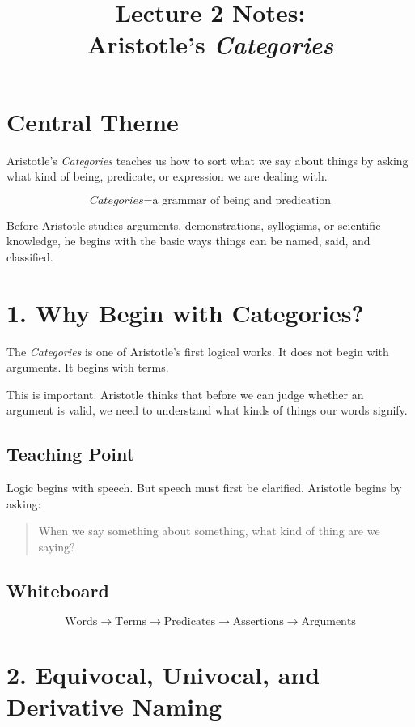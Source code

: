 \documentclass[12pt]{article}
\title{Lecture 2 Notes: \\ Aristotle's \textit{Categories}}
\author{}
\date{}
\begin{document}
\maketitle

\section*{Central Theme}

Aristotle's \textit{Categories} teaches us how to sort what we say about things
by asking what kind of being, predicate, or expression we are dealing with.

\[
\boxed{
\textit{Categories} = \text{a grammar of being and predication}
}
\]

Before Aristotle studies arguments, demonstrations, syllogisms, or scientific
knowledge, he begins with the basic ways things can be named, said, and
classified.

\section*{1. Why Begin with Categories?}

The \textit{Categories} is one of Aristotle's first logical works. It does not
begin with arguments. It begins with terms.

This is important. Aristotle thinks that before we can judge whether an
argument is valid, we need to understand what kinds of things our words signify.

\subsection*{Teaching Point}

Logic begins with speech. But speech must first be clarified. Aristotle begins
by asking:

\begin{quote}
When we say something about something, what kind of thing are we saying?
\end{quote}

\subsection*{Whiteboard}

\[
\text{Words} \rightarrow \text{Terms} \rightarrow \text{Predicates}
\rightarrow \text{Assertions} \rightarrow \text{Arguments}
\]

\section*{2. Equivocal, Univocal, and Derivative Naming}
\end{document}
